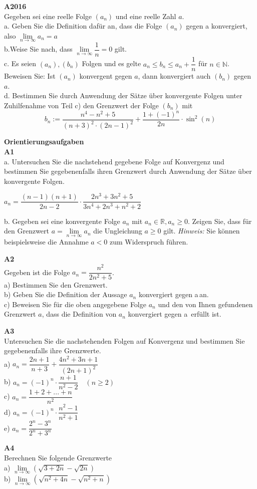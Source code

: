 \documentclass[landscape,twocolumn,a4paper]{article}
\begin{document}
\textbf{A2016} \\
Gegeben sei eine reelle Folge $(a_n)$ und eine reelle Zahl $a$. \\
a. Geben Sie die Definition dafür an, dass die Folge $(a_n)$ gegen a konvergiert, also $\lim \limits_{n \to \infty} a_n = a$ \\
b.Weise Sie nach, dass  $ \lim \limits_{n \to \infty} \dfrac{1}{n} = 0$ gilt. \\
c. Es seien $(a_n), (b_n)$ Folgen und es gelte $a_n \le b_n \le a_n + \dfrac{1}{n}$ für $n \in \mathbb{N}$.
Beweisen Sie: Ist $(a_n)$ konvergent gegen $a$, dann konvergiert auch $(b_n)$ gegen $a$. \\
d. Bestimmen Sie durch Anwendung der Sätze über konvergente Folgen unter Zuhilfenahme von Teil c) den Grenzwert der Folge $(b_n)$ mit 
$$b_n := \dfrac{n^4-n^2+5}{(n+3)^2 \cdot (2n-1)^2} + \dfrac{1+(-1)^n}{2n} \cdot  \sin^2(n)$$
\bigskip

\textbf{Orientierungsaufgaben} \\

\textbf{A1} \\
a. Untersuchen Sie die nachstehend gegebene Folge auf Konvergenz und bestimmen Sie gegebenenfalls
ihren Grenzwert durch Anwendung der Sätze über konvergente Folgen. 

$a_n = \dfrac{(n-1)(n+1)}{2n-2} \cdot \dfrac{2n^3+3n^2+5}{3n^4+2n^3+n^2+2}$ 

b. Gegeben sei eine konvergente Folge $a_n$ mit $a_n \in \mathbb{R}, a_n \ge 0$. Zeigen Sie, dass
für den Grenzwert $a = \lim \limits_{n \to \infty} a_n$ die Ungleichung $a \ge 0$ gilt. \textit{Hinweis:} Sie
können beispielsweise die Annahme $a < 0$ zum Widerspruch führen.
\bigskip

\newpage

\textbf{A2} \\
Gegeben ist die Folge $a_n = \dfrac{n^2}{2n^2+5}$. \\
a) Bestimmen Sie den Grenzwert. \\
b) Geben Sie die Definition der Aussage \glqq $a_n$ konvergiert gegen a\grqq\,an. \\
c) Beweisen Sie für die oben angegebene Folge $a_n$ und den von Ihnen gefundenen Grenzwert $a$, dass die
Definition von \glqq $a_n$ konvergiert gegen a\grqq\ erfüllt ist.\\
\bigskip

\textbf{A3} \\
Untersuchen Sie die nachstehenden Folgen auf Konvergenz und bestimmen Sie gegebenenfalls ihre Grenzwerte. \\
a) $a_n = \dfrac{2n+1}{n+3} + \dfrac{4n^2+3n+1}{(2n+1)^2} $\\
b) $a_n = (-1)^n \cdot \dfrac{n+1}{n^2-2} \quad (n \ge 2)$ \\
c) $a_n = \dfrac{1+2+...+n}{n^2} $ \\
d) $a_n = (-1)^n \cdot \dfrac{n^2-1}{n^2+1}$ \\
e) $a_n = \dfrac{2^n-3^n}{2^n+3^n}$

\textbf{A4} \\
Berechnen Sie folgende Grenzwerte \\
a) $\lim \limits_{n \to \infty} (\sqrt{3+2n}-\sqrt{2n})$ \\
b) $\lim \limits_{n \to \infty} (\sqrt{n^2+4n}-\sqrt{n^2+n})$ \\
\end{document}
